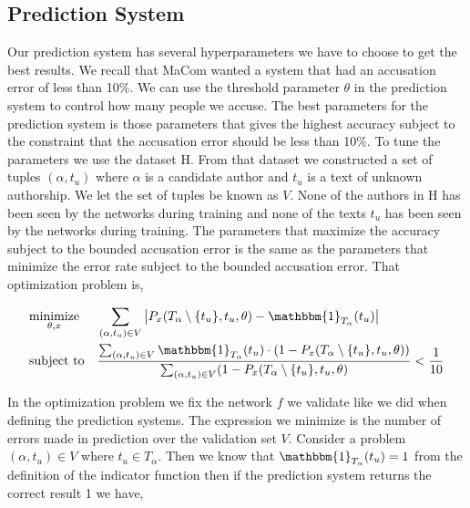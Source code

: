 \subsection{Prediction System}

Our prediction system has several hyperparameters we have to choose to get
the best results. We recall that MaCom wanted a system that had an accusation
error of less than 10\%. We can use the threshold parameter $\theta$ in the
prediction system to control how many people we accuse. The best parameters
for the prediction system is those parameters that gives the highest accuracy
subject to the constraint that the accusation error should be less than 10\%. To
tune the parameters we use the dataset \gls{H}. From that dataset we constructed
a set of tuples $(\alpha, t_u)$ where $\alpha$ is a candidate author and $t_u$
is a text of unknown authorship. We let the set of tuples be known as $V$. None
of the authors in \gls{H} has been seen by the networks during training and none
of the texts $t_u$ has been seen by the networks during training. The parameters
that maximize the accuracy subject to the bounded accusation error is the same
as the parameters that minimize the error rate subject to the bounded accusation
error. That optimization problem is,

\begin{equation}
    \label{eq:prediction_system_minimization}
    \begin{aligned}
        & \underset{\theta, x}{\text{minimize}}
        & & \sum_{(\alpha, t_u) \in V} \left|
            P_x(T_\alpha \setminus \{t_u\}, t_u, \theta) -
            \mathbbm{1}_{T_\alpha}(t_u)
        \right| \\
        & \text{subject to}
        & & \frac{\sum_{(\alpha, t_u) \in V} \mathbbm{1}_{T_\alpha}(t_u) \cdot
            \left(1 - P_x(T_\alpha \setminus \{t_u\}, t_u, \theta)\right)}
{\sum_{(\alpha, t_u) \in V} (1 - P_x(T_\alpha \setminus \{t_u\}, t_u, \theta)} <
            \frac{1}{10}
    \end{aligned}
\end{equation}

In the optimization problem we fix the network $f$ we validate like we did
when defining the prediction systems. The expression we minimize is the
number of errors made in prediction over the validation set $V$. Consider a
problem $(\alpha, t_u) \in V$ where $t_u \in T_\alpha$. Then we know that
$\mathbbm{1}_{T_\alpha}(t_u) = 1$ from the definition of the indicator function
then if the prediction system returns the correct result 1 we have,

